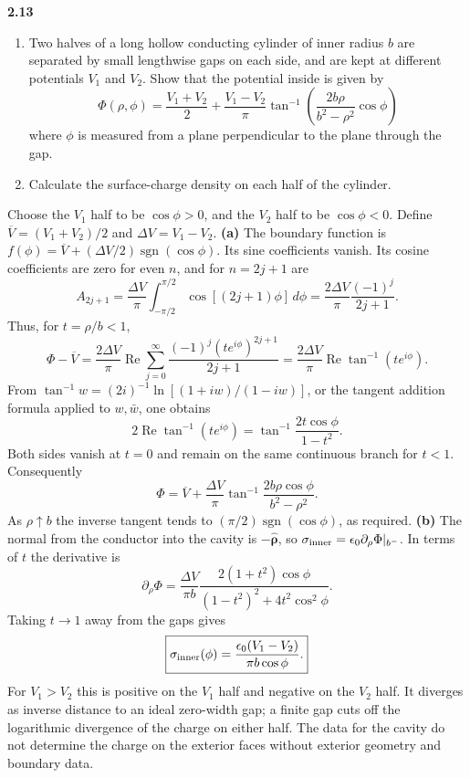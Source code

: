 \par\bigskip
\noindent\textbf{2.13}\quad\begin{enumerate}
\item[(a)] Two halves of a long hollow conducting cylinder of inner radius $b$ are separated by small lengthwise gaps on each side, and are kept at different potentials $V_{1}$ and $V_{2}$. Show that the potential inside is given by
\[
\Phi(\rho,\phi)=\frac{V_{1}+V_{2}}{2}+\frac{V_{1}-V_{2}}{\pi}\tan^{-1}\!\left(\frac{2b\rho}{b^{2}-\rho^{2}}\cos\phi\right)
\]
where $\phi$ is measured from a plane perpendicular to the plane through the gap.
\item[(b)] Calculate the surface-charge density on each half of the cylinder.
\end{enumerate}
\solution
Choose the $V_1$ half to be $\cos\phi>0$, and the $V_2$ half to be
$\cos\phi<0$. Define $\overline V=(V_1+V_2)/2$ and
$\Delta V=V_1-V_2$.
\textbf{(a)} The boundary function is
$f(\phi)=\overline V+(\Delta V/2)\operatorname{sgn}(\cos\phi)$.
Its sine coefficients vanish. Its cosine coefficients are zero for
even $n$, and for $n=2j+1$ are
\[
A_{2j+1}=\frac{\Delta V}{\pi}\int_{-\pi/2}^{\pi/2}
       \cos[(2j+1)\phi]\,d\phi
=\frac{2\Delta V}{\pi}\frac{(-1)^j}{2j+1}.
\]
Thus, for $t=\rho/b<1$,
\[
\Phi-\overline V=\frac{2\Delta V}{\pi}
 \operatorname{Re}\sum_{j=0}^\infty
       \frac{(-1)^j(te^{i\phi})^{2j+1}}{2j+1}
=\frac{2\Delta V}{\pi}\operatorname{Re}\tan^{-1}(te^{i\phi}).
\]
From $\tan^{-1}w=(2i)^{-1}\ln[(1+iw)/(1-iw)]$, or the tangent
addition formula applied to $w,\bar w$, one obtains
\[
2\operatorname{Re}\tan^{-1}(te^{i\phi})
=\tan^{-1}\frac{2t\cos\phi}{1-t^2}.
\]
Both sides vanish at $t=0$ and remain on the same continuous branch
for $t<1$. Consequently
\[
\boxed{\Phi=\overline V+\frac{\Delta V}{\pi}
 \tan^{-1}\frac{2b\rho\cos\phi}{b^2-\rho^2}.}
\]
As $\rho\uparrow b$ the inverse tangent tends to
$(\pi/2)\operatorname{sgn}(\cos\phi)$, as required.
\textbf{(b)} The normal from the conductor into the cavity is
$-\widehat{\boldsymbol\rho}$, so $\sigma_{\rm inner}=\epsilon _0
\partial_\rho\Phi|_{b^-}$. In terms of $t$ the derivative is
\[
\partial_\rho\Phi=\frac{\Delta V}{\pi b}
 \frac{2(1+t^2)\cos\phi}{(1-t^2)^2+4t^2\cos^2\phi}.
\]
Taking $t\to1$ away from the gaps gives
\[
\boxed{\sigma_{\rm inner}(\phi)=
       \frac{\epsilon _0(V_1-V_2)}{\pi b\cos\phi}.}
\]
For $V_1>V_2$ this is positive on the $V_1$ half and negative on the
$V_2$ half. It diverges as inverse distance to an ideal zero-width
gap; a finite gap cuts off the logarithmic divergence of the charge
on either half. The data for the cavity do not determine the charge
on the exterior faces without exterior geometry and boundary data.

